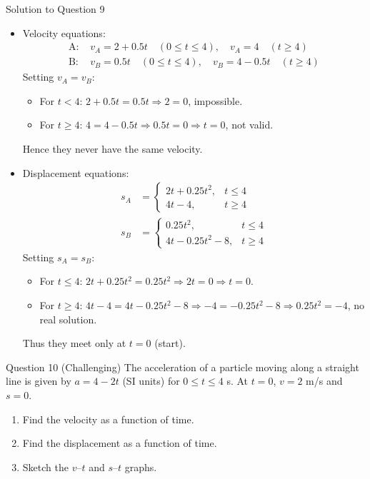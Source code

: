 \documentclass{beamer}
\begin{document}
\begin{frame}[shrink=15]{Solution to Question 9}
\begin{itemize}
    \item Velocity equations:
          \begin{align*}
              \text{A: } & v_A = 2 + 0.5t \quad (0 \le t \le 4), \quad v_A = 4 \quad (t \ge 4) \\
              \text{B: } & v_B = 0.5t \quad (0 \le t \le 4), \quad v_B = 4 - 0.5t \quad (t \ge 4)
          \end{align*}
          Setting $v_A = v_B$:
          \begin{itemize}
              \item For $t < 4$: $2 + 0.5t = 0.5t \Rightarrow 2 = 0$, impossible.
              \item For $t \ge 4$: $4 = 4 - 0.5t \Rightarrow 0.5t = 0 \Rightarrow t = 0$, not valid.
          \end{itemize}
          Hence they never have the same velocity.
    \item Displacement equations:
          \begin{align*}
              s_A &= 
              \begin{cases}
                  2t + 0.25t^2, & t \le 4 \\
                  4t - 4, & t \ge 4
              \end{cases} \\
              s_B &= 
              \begin{cases}
                  0.25t^2, & t \le 4 \\
                  4t - 0.25t^2 - 8, & t \ge 4
              \end{cases}
          \end{align*}
          Setting $s_A = s_B$:
          \begin{itemize}
              \item For $t \le 4$: $2t + 0.25t^2 = 0.25t^2 \Rightarrow 2t = 0 \Rightarrow t = 0$.
              \item For $t \ge 4$: $4t - 4 = 4t - 0.25t^2 - 8 \Rightarrow -4 = -0.25t^2 - 8 \Rightarrow 0.25t^2 = -4$, no real solution.
          \end{itemize}
          Thus they meet only at $t=0$ (start).
\end{itemize}
\end{frame}

\begin{frame}[shrink=15]{Question 10 (Challenging)}
The acceleration of a particle moving along a straight line is given by $a = 4 - 2t$ (SI units) for $0 \le t \le 4$ s. At $t=0$, $v=2$ m/s and $s=0$.
\begin{enumerate}
    \item Find the velocity as a function of time.
    \item Find the displacement as a function of time.
    \item Sketch the $v$–$t$ and $s$–$t$ graphs.
\end{enumerate}
\end{frame}
\end{document}

